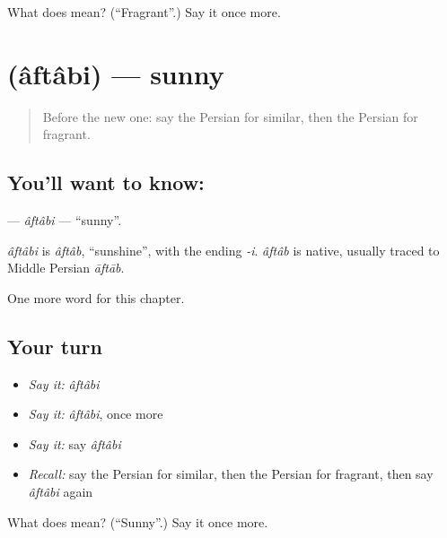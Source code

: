 \begin{tcolorbox}[breakable,colback=teal!4,colframe=teal!35!black,title={Before you move on}]
What does  mean? (\textquotedblleft{}Fragrant\textquotedblright{}.) Say it once more.
\end{tcolorbox}
\section[\texorpdfstring{\fa{آفتابی} (âftâbi)}{آفتابی (âftâbi)}]{ (âftâbi) — sunny}

\label{lesson:FA-C201-aftabi}



\begin{quote}
Before the new one: say the Persian for similar, then the Persian for fragrant.
\end{quote}

\subsection*{You'll want to know: }
\textbf{} — \emph{âftâbi} — \textquotedblleft{}sunny\textquotedblright{}.

\begin{cousinweb}
\emph{âftâbi} is \emph{âftâb}, \textquotedblleft{}sunshine\textquotedblright{}, with the ending \emph{-i}. \emph{âftâb} is native, usually traced to Middle Persian \emph{āftāb}.
\end{cousinweb}

\begin{grammarlens}[title={What you've built}]
One more word for this chapter.
\end{grammarlens}

\subsection*{Your turn}
\begin{itemize}
\raggedright
  \item \emph{Say it:} \emph{âftâbi}
  \item \emph{Say it:} \emph{âftâbi}, once more
  \item \emph{Say it:} say \emph{âftâbi}
  \item \emph{Recall:} say the Persian for similar, then the Persian for fragrant, then say \emph{âftâbi} again
\end{itemize}

\begin{tcolorbox}[breakable,colback=teal!4,colframe=teal!35!black,title={Before you move on}]
What does  mean? (\textquotedblleft{}Sunny\textquotedblright{}.) Say it once more.
\end{tcolorbox}
